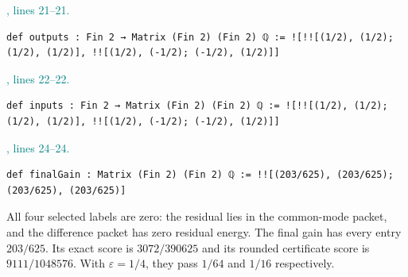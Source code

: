 \documentclass[11pt]{article}\usepackage{needspace}\renewcommand{\paperkind}{Lean companion}\setlength{\parskip}{0.35em}
\begin{document}

{\small\textcolor{teal}{, lines 21--21.}\par}

\begin{lstlisting}[style=BayesSource]
def outputs : Fin 2 → Matrix (Fin 2) (Fin 2) ℚ := ![!![(1/2), (1/2); (1/2), (1/2)], !![(1/2), (-1/2); (-1/2), (1/2)]]
\end{lstlisting}



{\small\textcolor{teal}{, lines 22--22.}\par}

\begin{lstlisting}[style=BayesSource]
def inputs : Fin 2 → Matrix (Fin 2) (Fin 2) ℚ := ![!![(1/2), (1/2); (1/2), (1/2)], !![(1/2), (-1/2); (-1/2), (1/2)]]
\end{lstlisting}



{\small\textcolor{teal}{, lines 24--24.}\par}

\begin{lstlisting}[style=BayesSource]
def finalGain : Matrix (Fin 2) (Fin 2) ℚ := !![(203/625), (203/625); (203/625), (203/625)]
\end{lstlisting}

All four selected labels are zero: the residual lies in the common-mode packet, and the difference packet has zero residual energy. The final gain has every entry $203/625$. Its exact score is $3072/390625$ and its rounded certificate score is $9111/1048576$. With $\varepsilon=1/4$, they pass $1/64$ and $1/16$ respectively.
\end{document}
